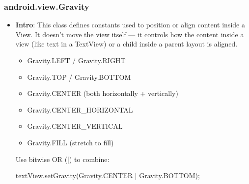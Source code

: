 \documentclass{report}
\begin{document}
    \subsubsection{android.view.Gravity}
    \begin{itemize}
        \item \textbf{Intro}: This class defines constants used to position or align content inside a View.
            \bigbreak \noindent 
            It doesn’t move the view itself — it controls how the content inside a view (like text in a TextView) or a child inside a parent layout is aligned.
            \begin{itemize}
                \item Gravity.LEFT / Gravity.RIGHT
                \item Gravity.TOP / Gravity.BOTTOM
                \item Gravity.CENTER (both horizontally + vertically)
                \item Gravity.CENTER\_HORIZONTAL
                \item Gravity.CENTER\_VERTICAL
                \item Gravity.FILL (stretch to fill)
            \end{itemize}
            Use bitwise OR (|) to combine:
            \bigbreak \noindent 
            \begin{javacode}
            textView.setGravity(Gravity.CENTER | Gravity.BOTTOM);
            \end{javacode}
    \end{itemize}

    \pagebreak 
\end{document}
